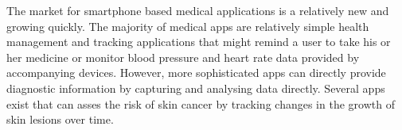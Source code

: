 The market for smartphone based medical applications is a relatively new and growing quickly. The majority of medical apps are relatively simple health management and tracking applications that might remind a user to take his or her medicine or monitor blood pressure and heart rate data provided by accompanying devices. However, more sophisticated apps can directly provide diagnostic information by capturing and analysing data directly. Several apps exist that can asses the risk of skin cancer by tracking changes in the growth of skin lesions over time.
